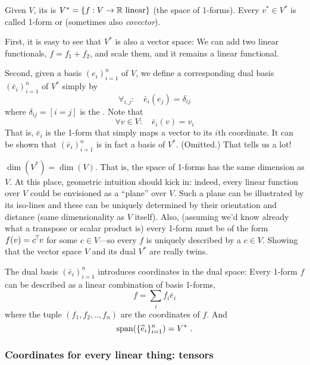 \begin{myDefinition}
Given $V$, its  is $V^* = \{ f: V\to {\mathbb{R}}~ \text{linear}\}$ (the space of 1-forms). Every $v^*\in V^*$ is
called 1-form or  (sometimes also \emph{covector}).
\end{myDefinition}

First, it is easy to see that $V^*$ is also a vector space: We can add
two linear functionals, $f = f_1 + f_2$, and scale them, and it remains
a linear functional.

Second, given a basis $(e_i)_{i=1}^n$ of $V$, we define a corresponding
dual basis $(\bar e_i)_{i=1}^n$ of $V^*$ simply by 
\begin{equation}
\forall_{i,j}:\quad \bar e_i (e_j) = \delta_{ij}
\end{equation}
where $\delta_{ij}= [i=j]$ is the . Note that
\begin{equation}
\forall v\in V:\quad \bar e_i (v) = v_i
\end{equation}
That is, $\bar e_i$ is the 1-form
that simply maps a vector to its $i$th coordinate. It can be shown
that $(\bar e_i)_{i=1}^n$ is in fact a basis of $V^*$. (Omitted.) That
tells us a lot!

$\dim(V^*) = \dim(V)$. That is, the space of 1-forms has
the same dimension as $V$. At this place, geometric intuition should
kick in: indeed, every linear function over $V$ could be envisioned as
a ``plane'' over $V$. Such a plane can be illustrated by its
iso-lines and these can be uniquely determined by their orientation
and distance (same dimensionality as $V$ itself). Also, (assuming we'd
know already what a transpose or scalar product is) every 1-form must be of the form $f(v) = c^{\!\top\!} v$ for some $c\in V$---so
every $f$ is uniquely described by a $c\in V$. Showing that the vector
space $V$ and its dual $V^*$ are really twins.

The dual basis $(\bar e_i)_{i=1}^n$ introduces coordinates in the dual
space: Every 1-form $f$ can be described as a linear combination of basis 1-forms,
\begin{equation}
f = \sum_i f_i \bar e_i
\end{equation}
where the tuple $(f_1,f_2,..,f_n)$ are the
coordinates of $f$. And
\begin{equation}
 \operatorname{span}(\{\widehat e_i\}_{i=1}^n) = V^* ~.
\end{equation}

\subsubsection{Coordinates for every linear thing: tensors}

